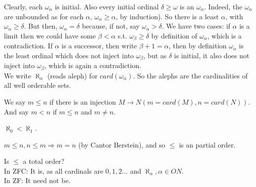 Clearly, each $\omega_\alpha$ is initial. Also every initial ordinal $\delta \ge \omega$ is an $\omega_\alpha$. Indeed, the $\omega_\alpha$ are unbounded as for each $\alpha$, $\omega_\alpha \ge \alpha$, by induction). So there is a least $\alpha$, with $\omega_\alpha \ge \delta$. But then, $\omega_\alpha = \delta$ because, if not, say $\omega_\alpha>\delta$. We have two cases: if $\alpha$ is a limit then we could have some $\beta<\alpha$ s.t. $\omega_\beta \ge \delta$ by definition of $\omega_\alpha$, which is a contradiction. If $\alpha$ is a successor, then write $\beta+1=\alpha$, then by definition $\omega_\alpha$ is the least ordinal which does not inject into $\omega_\beta$, but as $\delta$ is initial, it also does not inject into $\omega_\beta$, which is again a contradiction.\\
We write $\aleph_\alpha$ (reads aleph) for $card(\omega_\alpha)$. So the alephs are the cardinalities of all well orderable sets.
\begin{definition} We say $m \le n$ if there is an injection $M \rightarrow N (m=card(M),n=card(N))$. And say $m < n$ if $m \le n$ and $m \neq n$.
\end{definition}
\begin{example} $\aleph_0 < \aleph_1$.
\end{example}
\begin{remark}
$m \le n, n \le m \Rightarrow m=n$ (by Cantor Berstein), and so $\le$ is an partial order.
\end{remark}
Is $\le$ a total order?\\
In ZFC: It is, as all cardinals are $0,1,2 \ldots$ and $\aleph_\alpha, \alpha \in ON$.\\
In ZF: It need not be.\\
